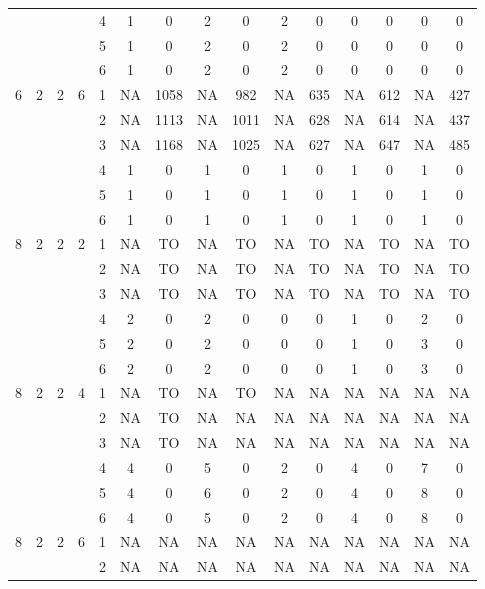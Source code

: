 \begin{longtable}{|c|c|c|c|c|c c|c c|c c|c c|c c|}
 & & & & 4 & 1 & 0 & 2 & 0 & 2 & 0 & 0 & 0 & 0 & 0 \\
 & & & & 5 & 1 & 0 & 2 & 0 & 2 & 0 & 0 & 0 & 0 & 0 \\
 & & & & 6 & 1 & 0 & 2 & 0 & 2 & 0 & 0 & 0 & 0 & 0 \\
\hline
\multirow{6}{*}{6} & \multirow{6}{*}{2} & \multirow{6}{*}{2} & \multirow{6}{*}{6} & 1 & NA & 1058 & NA & 982 & NA & 635 & NA & 612 & NA & 427 \\
 & & & & 2 & NA & 1113 & NA & 1011 & NA & 628 & NA & 614 & NA & 437 \\
 & & & & 3 & NA & 1168 & NA & 1025 & NA & 627 & NA & 647 & NA & 485 \\
 & & & & 4 & 1 & 0 & 1 & 0 & 1 & 0 & 1 & 0 & 1 & 0 \\
 & & & & 5 & 1 & 0 & 1 & 0 & 1 & 0 & 1 & 0 & 1 & 0 \\
 & & & & 6 & 1 & 0 & 1 & 0 & 1 & 0 & 1 & 0 & 1 & 0 \\
\hline
\multirow{6}{*}{8} & \multirow{6}{*}{2} & \multirow{6}{*}{2} & \multirow{6}{*}{2} & 1 & NA & TO & NA & TO & NA & TO & NA & TO & NA & TO \\
 & & & & 2 & NA & TO & NA & TO & NA & TO & NA & TO & NA & TO \\
 & & & & 3 & NA & TO & NA & TO & NA & TO & NA & TO & NA & TO \\
 & & & & 4 & 2 & 0 & 2 & 0 & 0 & 0 & 1 & 0 & 2 & 0 \\
 & & & & 5 & 2 & 0 & 2 & 0 & 0 & 0 & 1 & 0 & 3 & 0 \\
 & & & & 6 & 2 & 0 & 2 & 0 & 0 & 0 & 1 & 0 & 3 & 0 \\
\hline
\multirow{6}{*}{8} & \multirow{6}{*}{2} & \multirow{6}{*}{2} & \multirow{6}{*}{4} & 1 & NA & TO & NA & TO & NA & NA & NA & NA & NA & NA \\
 & & & & 2 & NA & TO & NA & NA & NA & NA & NA & NA & NA & NA \\
 & & & & 3 & NA & TO & NA & NA & NA & NA & NA & NA & NA & NA \\
 & & & & 4 & 4 & 0 & 5 & 0 & 2 & 0 & 4 & 0 & 7 & 0 \\
 & & & & 5 & 4 & 0 & 6 & 0 & 2 & 0 & 4 & 0 & 8 & 0 \\
 & & & & 6 & 4 & 0 & 5 & 0 & 2 & 0 & 4 & 0 & 8 & 0 \\
\hline
\multirow{6}{*}{8} & \multirow{6}{*}{2} & \multirow{6}{*}{2} & \multirow{6}{*}{6} & 1 & NA & NA & NA & NA & NA & NA & NA & NA & NA & NA \\
 & & & & 2 & NA & NA & NA & NA & NA & NA & NA & NA & NA & NA \\

\end{longtable}
